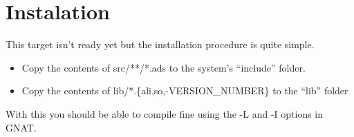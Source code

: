 \documentclass[a4paper]{book}
\begin{document}
\chapter{Instalation}
\label{sec:instalation}


	This target isn't ready yet but the installation procedure is quite simple.
	\begin{itemize}
		\item Copy the contents of src/**/*.ads to the system's ``include'' folder.
		\item Copy the contents of lib/*.\{ali,so,-VERSION\_NUMBER\} to the ``lib'' folder
	\end{itemize}

	With this you should be able to compile fine using the -L and -I options in GNAT.

	
\end{document}
